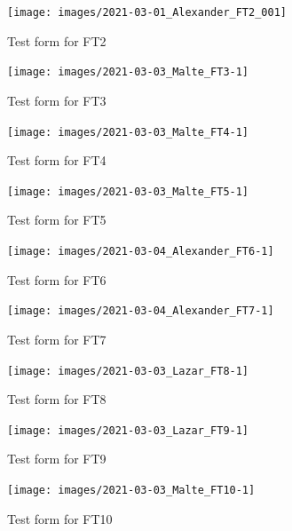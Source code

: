 \documentclass{article}
\begin{document}
 \begin{figure}
     \centering
     \texttt{[image: images/2021-03-01\_Alexander\_FT2\_001]}
     \renewcommand\figurename{Figure}
     \caption{Test form for FT2}
     \label{fig:my_label}
 \end{figure}
 
  \begin{figure}
     \centering
     \texttt{[image: images/2021-03-03\_Malte\_FT3-1]}
     \renewcommand\figurename{Figure}
     \caption{Test form for FT3}
     \label{fig:my_label}
 \end{figure}
 
 \begin{figure}
     \centering
     \texttt{[image: images/2021-03-03\_Malte\_FT4-1]}
     \renewcommand\figurename{Figure}
     \caption{Test form for FT4}
     \label{fig:my_label}
 \end{figure}

\begin{figure}
     \centering
     \texttt{[image: images/2021-03-03\_Malte\_FT5-1]}
     \renewcommand\figurename{Figure}
     \caption{Test form for FT5}
     \label{fig:my_label}
 \end{figure}
 
 \begin{figure}
     \centering
     \texttt{[image: images/2021-03-04\_Alexander\_FT6-1]}
     \renewcommand\figurename{Figure}
     \caption{Test form for FT6}
     \label{fig:my_label}
 \end{figure}
 
 \begin{figure}
     \centering
     \texttt{[image: images/2021-03-04\_Alexander\_FT7-1]}
     \renewcommand\figurename{Figure}
     \caption{Test form for FT7}
     \label{fig:my_label}
 \end{figure}
 
 \begin{figure}
     \centering
     \texttt{[image: images/2021-03-03\_Lazar\_FT8-1]}
     \renewcommand\figurename{Figure}
     \caption{Test form for FT8}
     \label{fig:my_label}
 \end{figure}
 
 \begin{figure}
     \centering
     \texttt{[image: images/2021-03-03\_Lazar\_FT9-1]}
     \renewcommand\figurename{Figure}
     \caption{Test form for FT9}
     \label{fig:my_label}
 \end{figure}
 
 \begin{figure}
     \centering
     \texttt{[image: images/2021-03-03\_Malte\_FT10-1]}
     \renewcommand\figurename{Figure}
     \caption{Test form for FT10}
     \label{fig:my_label}
 \end{figure}
 
\end{document}
